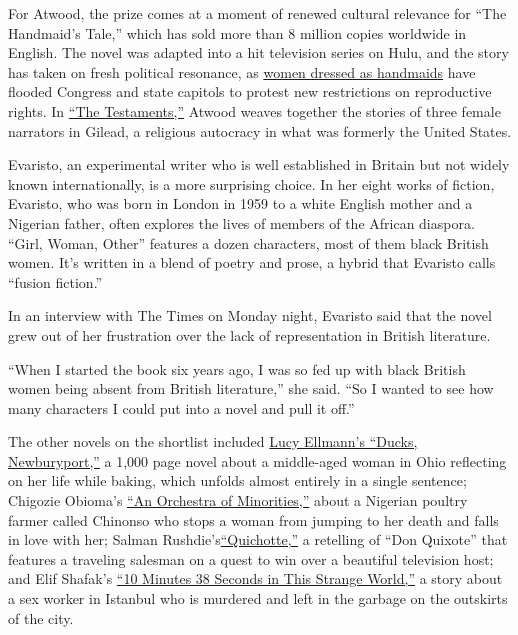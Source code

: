 For Atwood, the prize comes at a moment of renewed cultural relevance
for ``The Handmaid's Tale,'' which has sold more than 8 million copies
worldwide in English. The novel was adapted into a hit television series
on Hulu, and the story has taken on fresh political resonance, as
\href{https://www.nytimes3xbfgragh.onion/video/us/100000005479098/handmaids-protest-nationwide.html?module=inline}{women
dressed as handmaids} have flooded Congress and state capitols to
protest new restrictions on reproductive rights. In
\href{https://www.nytimes3xbfgragh.onion/2019/09/03/books/review/testaments-margaret-atwood-handmaids-tale.html?module=inline}{``The
Testaments,''} Atwood weaves together the stories of three female
narrators in Gilead, a religious autocracy in what was formerly the
United States.

Evaristo, an experimental writer who is well established in Britain but
not widely known internationally, is a more surprising choice. In her
eight works of fiction, Evaristo, who was born in London in 1959 to a
white English mother and a Nigerian father, often explores the lives of
members of the African diaspora. ``Girl, Woman, Other'' features a dozen
characters, most of them black British women. It's written in a blend of
poetry and prose, a hybrid that Evaristo calls ``fusion fiction.''

In an interview with The Times on Monday night, Evaristo said that the
novel grew out of her frustration over the lack of representation in
British literature.

``When I started the book six years ago, I was so fed up with black
British women being absent from British literature,'' she said. ``So I
wanted to see how many characters I could put into a novel and pull it
off.''

The other novels on the shortlist included
\href{https://www.nytimes3xbfgragh.onion/2019/09/03/books/review-ducks-newburyport-lucy-ellmann.html}{Lucy
Ellmann's ``Ducks, Newburyport,''} a 1,000 page novel about a
middle-aged woman in Ohio reflecting on her life while baking, which
unfolds almost entirely in a single sentence; Chigozie Obioma's
\href{https://www.nytimes3xbfgragh.onion/2019/01/21/books/review/chigozie-obioma-orchestra-minorities.html?module=inline}{``An
Orchestra of Minorities,''} about a Nigerian poultry farmer called
Chinonso who stops a woman from jumping to her death and falls in love
with her; Salman
Rushdie's\href{https://www.nytimes3xbfgragh.onion/2019/09/03/books/review/quichotte-salman-rushdie.html}{``Quichotte,''}
a retelling of ``Don Quixote'' that features a traveling salesman on a
quest to win over a beautiful television host; and Elif Shafak's
\href{https://www.theguardian.com/books/2019/jun/16/10-minutes-38-seconds-in-this-strange-world-by-elif-shafak-book-review}{``10
Minutes 38 Seconds in This Strange World,''} a story about a sex worker
in Istanbul who is murdered and left in the garbage on the outskirts of
the city.

